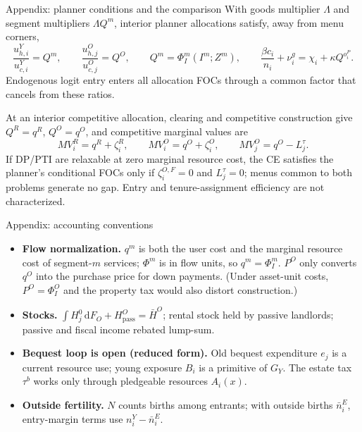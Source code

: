 \documentclass[11pt,aspectratio=169]{beamer}
\newcommand{\dd}{\mathrm d}
\newcommand{\1}{\mathbf 1}
\begin{document}
\begin{frame}{Appendix: planner conditions and the comparison}
\small
With goods multiplier $\Lambda$ and segment multipliers $\Lambda Q^m$, interior planner allocations satisfy, away from menu corners,
\[
\frac{u_{h,i}^Y}{u_{c,i}^Y}=Q^{m},
\qquad
\frac{u_{h,j}^O}{u_{c,j}^O}=Q^O,
\qquad
Q^m=\Phi_I^m(I^m;Z^m),
\qquad
\frac{\beta c_i}{n_i}+\nu_i^g=\chi_i+\kappa Q^{o_i^P}.
\]
Endogenous logit entry enters all allocation FOCs through a common factor that cancels from these ratios.

\medskip
At an interior competitive allocation, clearing and competitive construction give $Q^R=q^R$, $Q^O=q^O$, and competitive marginal values are
\[
MV_i^R=q^R+\zeta_i^R,
\qquad
MV_i^O=q^O+\zeta_i^O,
\qquad
MV_j^O=q^O-L_j^\tau .
\]
If DP/PTI are relaxable at zero marginal resource cost, the CE satisfies the planner's conditional FOCs only if $\zeta_i^{O,F}=0$ and $L_j^\tau=0$; menus common to both problems generate no gap. Entry and tenure-assignment efficiency are not characterized.
\end{frame}

\begin{frame}{Appendix: accounting conventions}
\small
\begin{itemize}\setlength{\itemsep}{0.45em}
  \item \textbf{Flow normalization.} $q^m$ is both the user cost and the marginal resource cost of segment-$m$ services; $\Phi^m$ is in flow units, so $q^m=\Phi_I^m$. $P^O$ only converts $q^O$ into the purchase price for down payments. (Under asset-unit costs, $P^O=\Phi_I^O$ and the property tax would also distort construction.)
  \item \textbf{Stocks.} $\int H_j^0\,\dd F_O+H_{\mathrm{pass}}^O=\bar H^O$; rental stock held by passive landlords; passive and fiscal income rebated lump-sum.
  \item \textbf{Bequest loop is open (reduced form).} Old bequest expenditure $e_j$ is a current resource use; young exposure $B_i$ is a primitive of $G_Y$. The estate tax $\tau^b$ works only through pledgeable resources $A_i(x)$.
  \item \textbf{Outside fertility.} $N$ counts births among entrants; with outside births $\bar n_i^E$, entry-margin terms use $n_i^Y-\bar n_i^E$.
\end{itemize}
\end{frame}
\end{document}
